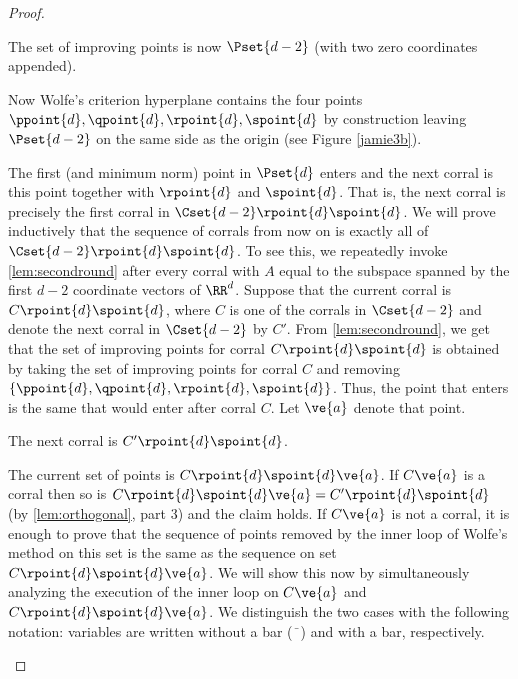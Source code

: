 \begin{proof}
\begin{claim}
The set of improving points is now $\Pset{d-2}$ (with two zero coordinates appended).
\end{claim}
\begin{claimproof}
Now Wolfe's criterion hyperplane contains the four points $\ppoint{d},\qpoint{d},\rpoint{d},\spoint{d}$ by construction leaving $\Pset{d-2}$ on the same
side as the origin (see Figure \ref{jamie3b}).
\end{claimproof}



The first (and minimum norm) point in $\Pset{d}$ enters and the next corral is this point together with $\rpoint{d}$ and $\spoint{d}$.
That is, the next corral is precisely the first corral in $\Cset{d-2} \rpoint{d} \spoint{d}$. 
We will prove inductively that the sequence of corrals from now on is exactly all of $\Cset{d-2} \rpoint{d} \spoint{d}$.
To see this, we repeatedly invoke \cref{lem:secondround} after every corral with $A$ equal to the subspace spanned by the first 
$d-2$ coordinate vectors of $\RR^d$.
Suppose that the current corral is $C \rpoint{d} \spoint{d}$, where $C$ is one of the corrals in $\Cset{d-2}$ and denote the next corral in $\Cset{d-2}$ by $C'$.
From \cref{lem:secondround}, we get that the set of improving points for corral $C \rpoint{d} \spoint{d}$ is obtained by taking the set of improving points 
for corral $C$ and removing $\{\ppoint{d}, \qpoint{d}, \rpoint{d}, \spoint{d}\}$.
Thus, the point that enters is the same that would enter after corral $C$. Let $\ve{a}$ denote that point.
\begin{claim}
The next corral is $C'\rpoint{d}\spoint{d}$.
\end{claim}
\begin{claimproof}
The current set of points is $C\rpoint{d} \spoint{d} \ve{a} $.
If $C \ve{a} $ is a corral then so is $C\rpoint{d} \spoint{d} \ve{a} = C' \rpoint{d} \spoint{d}$ (by \cref{lem:orthogonal}, part 3) and the claim holds.
If $C \ve{a} $ is not a corral, it is enough to prove that the sequence of points removed by the inner loop of Wolfe's method on this set is the same as the sequence on set $C\rpoint{d} \spoint{d} \ve{a}$.
We will show this now by simultaneously analyzing the execution of the inner loop on $C \ve{a} $ and $C\rpoint{d} \spoint{d} \ve{a}$. 
We distinguish the two cases with the following notation: variables are written without a bar ($\bar{\phantom{x}}$) and with a bar, respectively.


\end{claimproof}
\end{proof}
